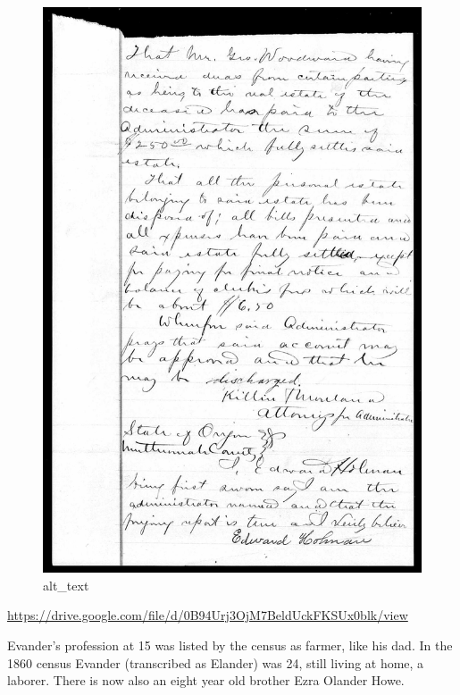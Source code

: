 \documentclass[
  12pt,
]{book}
\begin{document}
\begin{figure}
\centering
\includegraphics{images/0201b_images/image4.png}
\caption{alt\_text}
\end{figure}

\url{https://drive.google.com/file/d/0B94Urj3OjM7BeldUckFKSUx0blk/view}

Evander's profession at 15 was listed by the census as farmer, like his dad. In the 1860 census Evander (transcribed as Elander) was 24, still living at home, a laborer. There is now also an eight year old brother Ezra Olander Howe.
\end{document}
